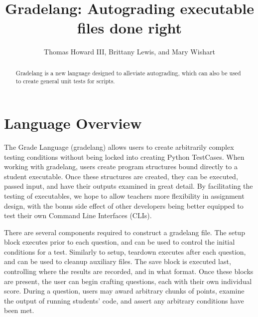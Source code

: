 \documentclass{article}
\title{Gradelang: Autograding executable files done right}
\author{Thomas Howard III, Brittany Lewis, and Mary Wishart}
\begin{document}
    \maketitle

    \begin{abstract}
        Gradelang is a new language designed to alleviate autograding, which can also be used to create general unit tests for scripts.
    \end{abstract}
    
    \section{Language Overview}
    The Grade Language (gradelang) allows users to create arbitrarily complex testing conditions without being locked into creating Python TestCases.
    When working with gradelang, users create program structures bound directly to a student executable.
    Once these structures are created, they can be executed, passed input, and have their outputs examined in great detail. By facilitating the testing of executables, we hope to allow teachers more flexibility in assignment design, with the bonus side effect of other developers being better equipped to test their own Command Line Interfaces (CLIs).

    There are several components required to construct a gradelang file.
    The setup block executes prior to each question, and can be used to control the initial conditions for a test.
    Similarly to setup, teardown executes after each question, and can be used to cleanup auxiliary files.
    The save block is executed last, controlling where the results are recorded, and in what format.
    Once these blocks are present, the user can begin crafting questions, each with their own individual score.
    During a question, users may award arbitrary chunks of points, examine the output of running students' code, and assert any arbitrary conditions have been met.
      
    \newpage
\end{document}
